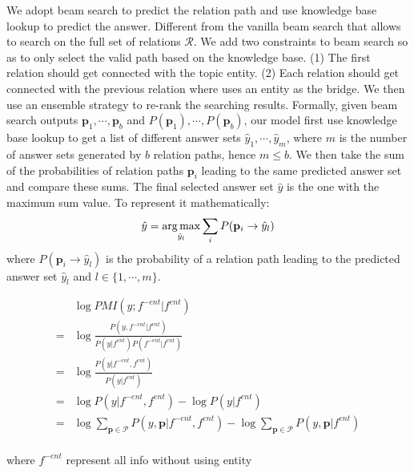 We adopt beam search to predict the relation path and use knowledge base lookup to predict the answer. Different from the vanilla beam search that allows to search on the full set of relations $\mathcal{R}$. We add two constraints to beam search so as to only select the valid path based on the knowledge base. (1) The first relation should get connected with the topic entity. (2) Each relation should get connected with the previous relation where uses an entity as the bridge. We then use an ensemble strategy to re-rank the searching results. Formally, given beam search outputs $\mathbf{p}_{1},\cdots,\mathbf{p}_{b}$ and $P(\mathbf{p}_{1}),\cdots,P(\mathbf{p}_{b})$, our model first use knowledge base lookup to get a list of different answer sets $\hat{y}_1,\cdots,\hat{y}_m$, where $m$ is the number of answer sets generated by $b$ relation paths, hence $m \leq b$. We then take the sum of the probabilities of relation paths $\mathbf{p}_i$ leading to the same predicted answer set and compare these sums. The final selected answer set $\hat{y}$ is the one with the maximum sum value. To represent it mathematically:
\begin{equation}
\hat{y}=\operatorname*{arg\,max}_{\hat{y}_l} \sum_{i} P(\mathbf{p}_i\rightarrow \hat{y}_l)
\end{equation}
where $P(\mathbf{p}_i\rightarrow \hat{y}_l)$ is the probability of a relation path leading to the predicted answer set $\hat{y}_l$ and $l \in \lbrace 1, \cdots, m\rbrace$. 

\begin{equation}
\begin{aligned}
&\log PMI(y;f^{-ent}|f^{ent})\\
=& \log\frac{P(y,f^{-ent}|f^{ent})}{P(y|f^{ent})P(f^{-ent}|f^{ent})}\\
=& \log\frac{P(y|f^{-ent},f^{ent})}{P(y|f^{ent})}\\
=& \log P(y|f^{-ent},f^{ent})-\log P(y|f^{ent})\\
=& \log\sum_{\mathbf{p}\in\mathcal{P}}P(y,\mathbf{p}|f^{-ent},f^{ent}) - \log\sum_{\mathbf{p}\in\mathcal{P}}P(y,\mathbf{p}|f^{ent})\\
\end{aligned}
\end{equation}

where $f^{-ent}$ represent all info without using entity


